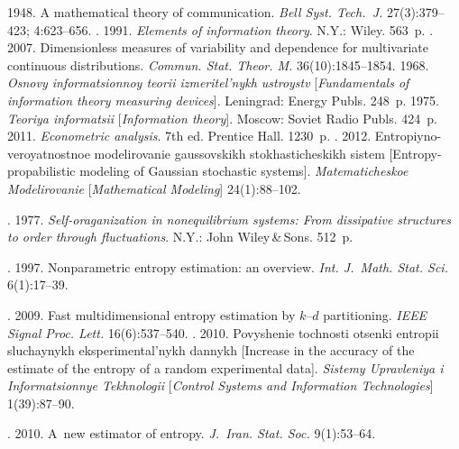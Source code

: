 \begin{multicols}{2}
{{\begin{thebibliography}{99}
 1948. A mathematical theory of communication.
\textit{Bell Syst. Tech.~J.} 27(3):379--423; 4:623--656.
. 1991. \textit{Elements of information 
theory}. N.Y.: Wiley. 563~p.
. 2007. Dimensionless measures of variability 
and dependence for multivariate continuous distributions. 
\textit{Commun. Stat. Theor. M.} 36(10):1845--1854.
 1968.  \textit{Osnovy informatsionnoy teorii 
izmeritel'nykh ustroystv}
[\textit{Fundamentals of information theory measuring devices}]. Leningrad: Energy Publs. 248~p.
 1975.  \textit{Teoriya informatsii}
[\textit{Information theory}]. Moscow: Soviet Radio Publs. 424~p.
 2011. \textit{Econometric analysis}. 7th ed. Prentice 
Hall. 1230~p.
. 2012. Entropiyno-veroyatnostnoe 
modelirovanie gaussovskikh sto\-khas\-ti\-che\-skikh sistem 
[Entropy-propabilistic modeling of Gaussian stochastic systems].
\textit{Matematicheskoe 
Modelirovanie} [\textit{Mathematical Modeling}] 24(1):88--102.

\vspace*{3pt}

. 1977. 
\textit{Self-oraganization in nonequilibrium systems:
From dissipative structures to order through fluctuations}.
N.Y.: John Wiley\,\&\,Sons. 512~p.

\vspace*{3pt}

. 
1997.  Nonparametric entropy estimation: an overview. \textit{Int. 
J.~Math. Stat. Sci.} 
6(1):17--39.

\columnbreak

. 2009. Fast multidimensional entropy 
estimation by $k$--$d$ partitioning. \textit{IEEE Signal Proc. Lett.} 
16(6):537--540.
. 2010. Povyshenie toch\-nosti otsenki 
entropii sluchaynykh eksperimental'nykh dannykh
[Increase in the accuracy of the estimate of the entropy of a random experimental
data]. \textit{Sistemy Upravleniya i 
Informatsionnye Tekhnologii} [\textit{Control Systems and Information Technologies}]
1(39):87--90.


. 2010. A~new estimator of entropy. 
\textit{J.~Iran. Stat. Soc.}  9(1):53--64.
  
\end{thebibliography}
} }



\end{multicols}

